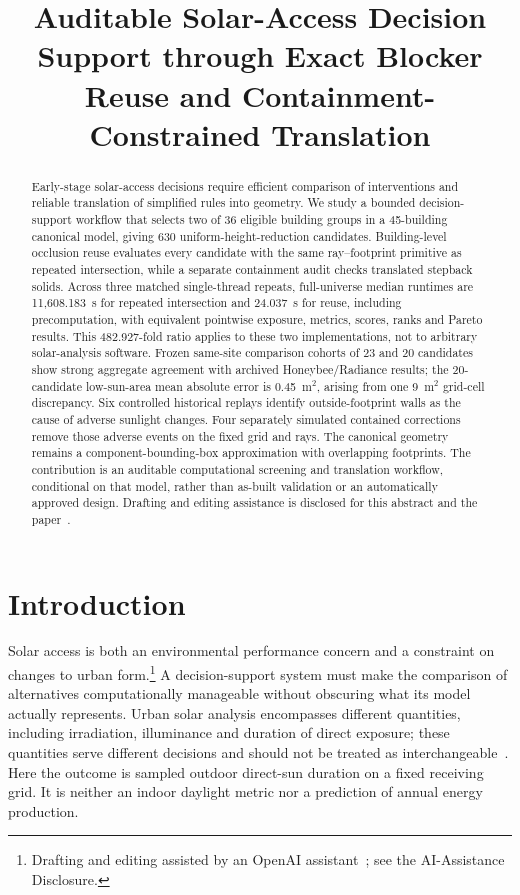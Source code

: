\documentclass{llncs}
\newcommand{\aidraft}{\footnote{Drafting and editing assisted by an OpenAI assistant~\cite{openai2026}; see the AI-Assistance Disclosure.}}
\begin{document}
\title{Auditable Solar-Access Decision Support through Exact Blocker Reuse and Containment-Constrained Translation}
\author{}
\institute{}
\maketitle
\begin{abstract}
Early-stage solar-access decisions require efficient comparison of interventions and reliable translation of simplified rules into geometry. We study a bounded decision-support workflow that selects two of 36 eligible building groups in a 45-building canonical model, giving 630 uniform-height-reduction candidates. Building-level occlusion reuse evaluates every candidate with the same ray--footprint primitive as repeated intersection, while a separate containment audit checks translated stepback solids. Across three matched single-thread repeats, full-universe median runtimes are 11,608.183~s for repeated intersection and 24.037~s for reuse, including precomputation, with equivalent pointwise exposure, metrics, scores, ranks and Pareto results. This 482.927-fold ratio applies to these two implementations, not to arbitrary solar-analysis software. Frozen same-site comparison cohorts of 23 and 20 candidates show strong aggregate agreement with archived Honeybee/Radiance results; the 20-candidate low-sun-area mean absolute error is 0.45~m$^2$, arising from one 9~m$^2$ grid-cell discrepancy. Six controlled historical replays identify outside-footprint walls as the cause of adverse sunlight changes. Four separately simulated contained corrections remove those adverse events on the fixed grid and rays. The canonical geometry remains a component-bounding-box approximation with overlapping footprints. The contribution is an auditable computational screening and translation workflow, conditional on that model, rather than as-built validation or an automatically approved design. Drafting and editing assistance is disclosed for this abstract and the paper~\cite{openai2026}.
\end{abstract}

\section{Introduction}
Solar access is both an environmental performance concern and a constraint on changes to urban form.\aidraft{} A decision-support system must make the comparison of alternatives computationally manageable without obscuring what its model actually represents. Urban solar analysis encompasses different quantities, including irradiation, illuminance and duration of direct exposure; these quantities serve different decisions and should not be treated as interchangeable~\cite{compagnon2004urban,czachura2022metrics}. Here the outcome is sampled outdoor direct-sun duration on a fixed receiving grid. It is neither an indoor daylight metric nor a prediction of annual energy production.
\end{document}
